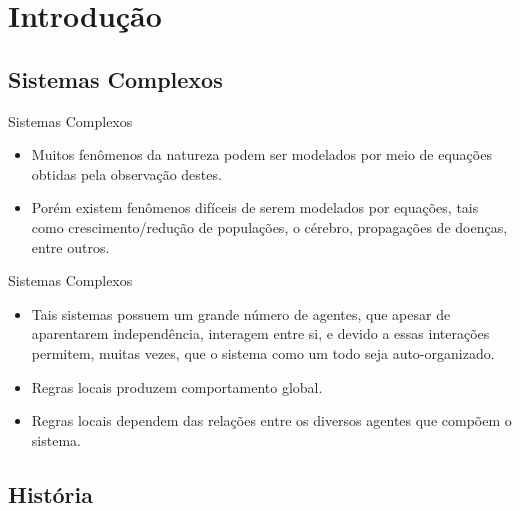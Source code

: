 \documentclass[compress, hide notes]{beamer}
\begin{document}
\frame{\titlepage}

\section{Introdução}

\subsection{Sistemas Complexos}

\begin{frame}{Sistemas Complexos}%
	
	\begin{itemize}
	
		\item Muitos fenômenos da natureza podem ser modelados por meio de equações obtidas pela observação destes.
		
		\bigskip
		
		\item Porém existem fenômenos difíceis de serem modelados por equações, tais como crescimento/redução de populações, o cérebro, propagações de doenças, entre outros.
			
	\end{itemize}
\end{frame}


\begin{frame}{Sistemas Complexos \cite{ufmg}}
	
	\begin{itemize}
	
		\item Tais sistemas possuem um grande número de agentes, que apesar de aparentarem independência, interagem entre si, e devido a essas interações permitem, muitas vezes, que o sistema como um todo seja auto-organizado.
		
		\bigskip
		
		\item Regras locais produzem comportamento global.
		
		\bigskip
		
		\item Regras locais dependem das relações entre os diversos agentes que compõem o sistema.
			
	\end{itemize}
\end{frame}

\subsection{História}
\end{document}
